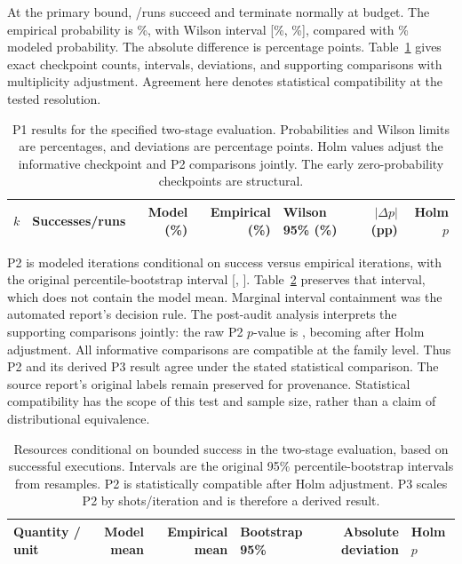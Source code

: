\documentclass[conference]{IEEEtran}
\begin{document}
At the primary bound, \SuccessRuns/\BaselineRuns runs succeed and \BudgetRuns terminate normally at budget. The empirical probability is \PrimaryEmpiricalPercent\%, with Wilson interval [\PrimaryCILower\%, \PrimaryCIUpper\%], compared with \PrimaryModelPercent\% modeled probability. The absolute difference is \PrimaryDeviationPP percentage points. Table~\ref{tab:probabilities} gives exact checkpoint counts, intervals, deviations, and supporting comparisons with multiplicity adjustment. Agreement here denotes statistical compatibility at the tested resolution.

\begin{table}[!t]
\centering\footnotesize
\caption{P1 results for the specified two-stage evaluation. Probabilities and Wilson limits are percentages, and deviations are percentage points. Holm values adjust the informative checkpoint and P2 comparisons jointly. The early zero-probability checkpoints are structural.}
\label{tab:probabilities}
\begin{tabular}{@{}rrrrlrr@{}}\toprule
$k$ & Successes/runs & Model (\%) & Empirical (\%) & Wilson 95\% (\%) & $|\Delta p|$ (pp) & Holm $p$ \\
\midrule


\end{tabular}
\end{table}

P2 is \PModelMean modeled iterations conditional on success versus \PEmpiricalMean empirical iterations, with the original percentile-bootstrap interval [\PMeanLow, \PMeanHigh]. Table~\ref{tab:conditional} preserves that interval, which does not contain the model mean. Marginal interval containment was the automated report's decision rule. The post-audit analysis interprets the supporting comparisons jointly: the raw P2 $p$-value is \PMeanRawP, becoming \PMeanAdjustedP after Holm adjustment. All informative comparisons are compatible at the family level. Thus P2 and its derived P3 result agree under the stated statistical comparison. The source report's original labels remain preserved for provenance. Statistical compatibility has the scope of this test and sample size, rather than a claim of distributional equivalence.

\begin{table}[!t]
\centering\footnotesize
\caption{Resources conditional on bounded success in the two-stage evaluation, based on \SuccessRuns successful executions. Intervals are the original 95\% percentile-bootstrap intervals from \BootstrapSamples resamples. P2 is statistically compatible after Holm adjustment. P3 scales P2 by \ShotsPerUpdate shots/iteration and is therefore a derived result.}
\label{tab:conditional}
\begin{tabular}{@{}lrrlrl@{}}\toprule
Quantity / unit & Model mean & Empirical mean & Bootstrap 95\% & Absolute deviation & Holm $p$ \\
\midrule


\end{tabular}
\end{table}
\end{document}
